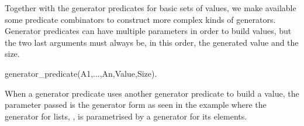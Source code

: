 Together with the generator predicates for basic sets of values, we make
available some predicate combinators to construct more complex kinds of
generators.
%
Generator predicates can have multiple parameters in order to build
values, but the two last arguments must always be, in this order, the
generated value and the size.
%
\begin{yapcode}
 generator_predicate(A1,...,An,Value,Size).
\end{yapcode}
%
When a generator predicate uses another generator predicate to build a
value, the parameter passed is the generator form as seen in the example
where the generator for lists, , is parametrised by a
generator for its elements.
%

\begin{yapcode}
\end{yapcode}

\begin{yapcode}
\end{yapcode}


\begin{yapcode}
\end{yapcode}

\begin{yapcode}
\end{yapcode}

